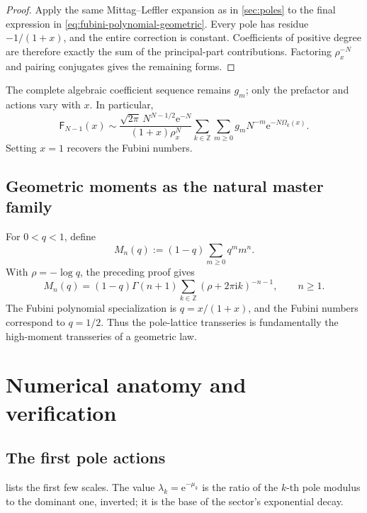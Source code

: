\documentclass[11pt,oneside]{article}
\numberwithin{equation}{section}
\newcommand{\e}{\mathrm e}
\newcommand{\ii}{\mathrm i}
\newcommand{\Z}{\mathbb Z}
\newcommand{\Fub}{\mathsf F}
\begin{document}
\begin{proof}
Apply the same Mittag--Leffler expansion as in \cref{sec:poles} to the final expression in \cref{eq:fubini-polynomial-geometric}.  Every pole has residue \(-1/(1+x)\), and the entire correction is constant.  Coefficients of positive degree are therefore exactly the sum of the principal-part contributions.  Factoring \(\rho_x^{-N}\) and pairing conjugates gives the remaining forms.
\end{proof}

The complete algebraic coefficient sequence remains \(g_m\); only the prefactor and actions vary with \(x\).  In particular,
\begin{equation}
 \Fub_{N-1}(x)\sim
 \frac{\sqrt{2\pi}\,N^{N-1/2}\e^{-N}}
 {(1+x)\rho_x^N}
 \sum_{k\in\Z}\sum_{m\ge0}
 g_mN^{-m}\e^{-N\Omega_k(x)}.
 \label{eq:fubini-x-double}
\end{equation}
Setting \(x=1\) recovers the Fubini numbers.

\subsection{Geometric moments as the natural master family}

For \(0<q<1\), define
\begin{equation}
 M_n(q):=(1-q)\sum_{m\ge0}q^m m^n.
 \label{eq:geometric-moment-definition}
\end{equation}
With \(\rho=-\log q\), the preceding proof gives
\begin{equation}
 M_n(q)=(1-q)\Gamma(n+1)
 \sum_{k\in\Z}(\rho+2\pi\ii k)^{-n-1},
 \qquad n\ge1.
 \label{eq:geometric-moment-poles}
\end{equation}
The Fubini polynomial specialization is \(q=x/(1+x)\), and the Fubini numbers correspond to \(q=1/2\).  Thus the pole-lattice transseries is fundamentally the high-moment transseries of a geometric law.

\section{Numerical anatomy and verification}
\label{sec:numerics}

\subsection{The first pole actions}

 lists the first few scales.  The value \(\lambda_k=\e^{-\mu_k}\) is the ratio of the \(k\)-th pole modulus to the dominant one, inverted; it is the base of the sector's exponential decay.
\end{document}
